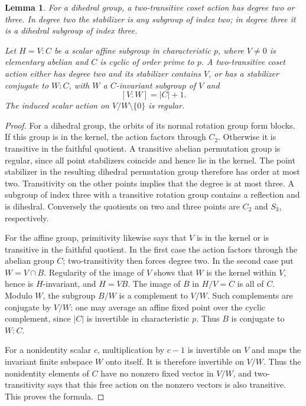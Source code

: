 \documentclass[11pt]{article}
\newtheorem{lemma}[theorem]{Lemma}
\begin{document}
\begin{lemma}\label{solvable}
For a dihedral group, a two-transitive coset action has degree two
or three. In degree two the stabilizer is any subgroup of index
two; in degree three it is a dihedral subgroup of index three.

Let $H=V:C$ be a scalar affine subgroup in characteristic $p$,
where $V\ne0$ is elementary abelian and $C$ is cyclic of order
prime to $p$. A two-transitive coset action either has degree
two and its stabilizer contains $V$, or has a stabilizer conjugate
to $W:C$, with $W$ a $C$-invariant subgroup of $V$ and
\[
 [V:W]=|C|+1.
\]
The induced scalar action on $V/W\setminus\{0\}$ is regular.
\end{lemma}
\begin{proof}
For a dihedral group, the orbits of its normal rotation group
form blocks. If this group is in the kernel, the action factors
through $C_2$. Otherwise it is transitive in the faithful quotient.
A transitive abelian permutation group is regular, since all
point stabilizers coincide and hence lie in the kernel. The
point stabilizer in the resulting dihedral permutation group
therefore has order at most two. Transitivity on the other
points implies that the degree is at most three. A subgroup of
index three with a transitive rotation group contains a reflection
and is dihedral. Conversely the quotients on two and three points
are $C_2$ and $S_3$, respectively.

For the affine group, primitivity likewise says that $V$ is in
the kernel or is transitive in the faithful quotient. In the
first case the action factors through the abelian group $C$;
two-transitivity then forces degree two. In the second case put
$W=V\cap B$. Regularity of the image of $V$ shows that $W$
is the kernel within $V$, hence is $H$-invariant, and $H=VB$.
The image of $B$ in $H/V=C$ is all of $C$. Modulo $W$,
the subgroup $B/W$ is a complement to $V/W$. Such complements
are conjugate by $V/W$: one may average an affine fixed point
over the cyclic complement, since $|C|$ is invertible in
characteristic $p$. Thus $B$ is conjugate to $W:C$.

For a nonidentity scalar $c$, multiplication by $c-1$ is
invertible on $V$ and maps the invariant finite subspace $W$
onto itself. It is therefore invertible on $V/W$. Thus the
nonidentity elements of $C$ have no nonzero fixed vector in
$V/W$, and two-transitivity says that this free action on the
nonzero vectors is also transitive. This proves the formula.
\end{proof}
\end{document}
